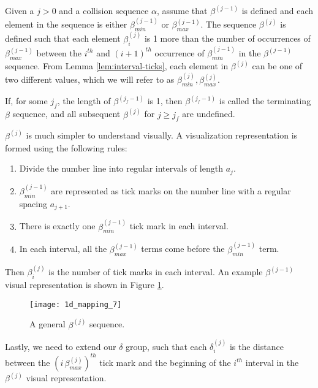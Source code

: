 \begin{definition}
  \label{def:beta-definition}
  Given a $j > 0$ and a collision sequence $\alpha$, assume that $\beta^{(j-1)}$ is defined and each element in the sequence is either $\beta^{(j-1)}_{min}$ or $\beta^{(j-1)}_{max}$. The sequence $\beta^{(j)}$ is defined such that each element $\beta^{(j)}_i$ is 1 more than the number of occurrences of $\beta^{(j-1)}_{max}$ between the $i^{th}$ and $(i+1)^{th}$ occurrence of $\beta^{(j-1)}_{min}$ in the $\beta^{(j-1)}$ sequence. From Lemma \ref{lem:interval-ticks}, each element in $\beta^{(j)}$ can be one of two different values, which we will refer to as $\beta^{(j)}_{min}, \beta^{(j)}_{max}$.

  If, for some $j_f$, the length of $\beta^{(j_f-1)}$ is 1, then $\beta^{(j_f-1)}$ is called the terminating $\beta$ sequence, and all subsequent $\beta^{(j)}$ for $j \ge j_f$ are undefined.
\end{definition}

$\beta^{(j)}$ is much simpler to understand visually. A visualization representation is formed using the following rules:

\begin{enumerate}
  \item Divide the number line into regular intervals of length $a_{j}$.
  \item $\beta^{(j-1)}_{min}$ are represented as tick marks on the number line with a regular spacing $a_{j+1}$.
  \item There is exactly one $\beta^{(j-1)}_{min}$ tick mark in each interval.
  \item In each interval, all the $\beta^{(j-1)}_{max}$ terms come before the $\beta^{(j-1)}_{min}$ term.
\end{enumerate}

Then $\beta^{(j)}_i$ is the number of tick marks in each interval. An example $\beta^{(j-1)}$ visual representation is shown in Figure \ref{fig:beta-sequence-j}.

\begin{figure}[H]
  \begin{center}
    \texttt{[image: 1d\_mapping\_7]}
  \end{center}
  \vspace{-.2in} %
  \caption{\label{fig:beta-sequence-j} A general $\beta^{(j)}$ sequence.}
\end{figure}


Lastly, we need to extend our $\delta$ group, such that each $\delta^{(j)}_i$ is the distance between the $(i \, \beta^{(j)}_{max})^{th}$ tick mark and the beginning of the $i^{th}$ interval in the $\beta^{(j)}$ visual representation.

